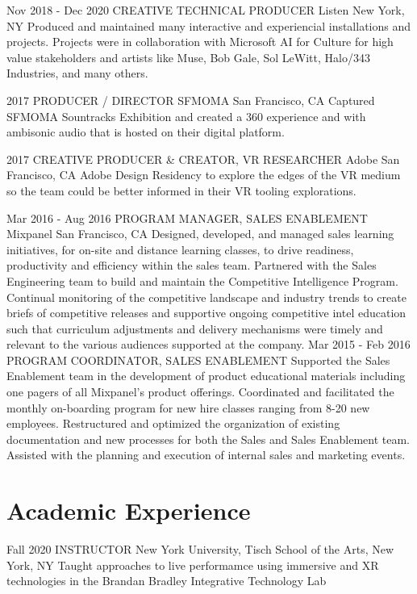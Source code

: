 \documentclass[11pt,a4paper,sans]{moderncv}   %
\begin{document}
\cventry
  {Nov 2018 - Dec 2020}
  {CREATIVE TECHNICAL PRODUCER}
  {Listen}
  {New York, NY}{}
  {Produced and maintained many interactive and experiencial installations and projects. Projects were in collaboration with Microsoft AI for Culture for high value stakeholders and artists like Muse, Bob Gale, Sol LeWitt, Halo/343 Industries, and many others.}

  \cventry
  {2017}
  {PRODUCER / DIRECTOR}
  {SFMOMA}
  {San Francisco, CA}{}
  {Captured SFMOMA Sountracks Exhibition and created a 360 experience and with ambisonic audio that is hosted on their digital platform.}
  
  \cventry
  {2017}
  {CREATIVE PRODUCER \& CREATOR, VR RESEARCHER}
  {Adobe}
  {San Francisco, CA}{}
  {Adobe Design Residency to explore the edges of the VR medium so the team could be better informed in their VR tooling explorations.}

  \cventry
  {Mar 2016 - Aug 2016}
  {PROGRAM MANAGER, SALES ENABLEMENT}
  {Mixpanel}
  {San Francisco, CA}{}
  {Designed, developed, and managed sales learning initiatives, for on-site and distance learning classes, to drive readiness, productivity and efficiency within the sales team. 
  Partnered with the Sales Engineering team to build and maintain the Competitive Intelligence Program. Continual monitoring of the competitive landscape and industry trends to create briefs of competitive releases and supportive ongoing competitive intel education such that curriculum adjustments and delivery mechanisms were timely and relevant to the various audiences supported at the company.}
\cventry
  {Mar 2015 - Feb 2016}
  {PROGRAM COORDINATOR, SALES ENABLEMENT}
  {}
  {}{}
  {Supported the Sales Enablement team in the development of product educational materials including one pagers of all Mixpanel's product offerings. 
  Coordinated and facilitated the monthly on-boarding program for new hire classes ranging from 8-20 new employees. Restructured and optimized the organization of existing documentation and new processes for both the Sales and Sales Enablement team. 
  Assisted with the planning and execution of internal sales and marketing events.}


\section{Academic Experience}
\cventry
  {Fall 2020}
  {INSTRUCTOR}
  {New York University, Tisch School of the Arts, 
  New York, NY}{}
  {}{}{}
  {Taught approaches to live performamce using immersive and XR technologies in the Brandan Bradley Integrative Technology Lab}
\end{document}
